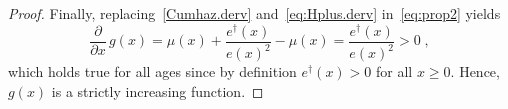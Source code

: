\documentclass[a4paper,twoside, openright, 12pt, leqno]{article}
\begin{document}
\begin{proof}
Finally, replacing~\eqref{Cumhaz.derv} and~\eqref{eq:Hplus.derv} in~\eqref{eq:prop2} yields
%
\begin{equation*}
 \frac{\partial}{\partial x}\,g(x)=\mu(x)+\frac{e^\dagger(x)}{e(x)^2}-\mu(x)=\frac{e^\dagger(x)}{e(x)^2}>0\;,
\end{equation*}
%
which holds true for all ages since by definition $e^\dagger(x)>0$ for all $x\geq0$. Hence, $g(x)$ is a strictly increasing function.
\end{proof}
\end{document}
